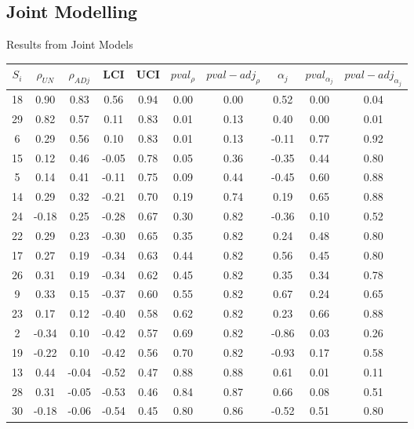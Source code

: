 \documentclass[a4paper,9pt]{beamer}\usepackage[]{graphicx}\usepackage[]{color}
\begin{document}
\subsection{Joint Modelling}

\begin{frame}{Results from Joint Models}
\tiny
\begin{table}[ht]
\centering
\begin{tabular}{cccccccccc}
  \hline
$S_i$ & $\rho_{UN}$ & $\rho_{ADj}$ & LCI & UCI & $pval_{\rho}$ & $pval-adj_{\rho}$ & $\alpha_j$ & $pval_{\alpha_j}$ & $pval-adj_{\alpha_j}$ \\ 
  \hline
\alert{18} & 0.90 & 0.83 & 0.56 & 0.94 & 0.00 & 0.00 & 0.52 & 0.00 & 0.04 \\ 
 \alert{29} & 0.82 & 0.57 & 0.11 & 0.83 & 0.01 & 0.13 & 0.40 & 0.00 & 0.01\\ 
  \alert{6} & 0.29 & 0.56 & 0.10 & 0.83 & 0.01 & 0.13 & -0.11 & 0.77 & 0.92 \\ 
  \alert{15} & 0.12 & 0.46 & -0.05 & 0.78 & 0.05 & 0.36 & -0.35 & 0.44 & 0.80 \\ 
  \alert{5} & 0.14 & 0.41 & -0.11 & 0.75 & 0.09 & 0.44 & -0.45 & 0.60 & 0.88 \\ 
  \alert{14} & 0.29 & 0.32 & -0.21 & 0.70 & 0.19 & 0.74 & 0.19 & 0.65 & 0.88 \\ 
  \alert{24} & -0.18 & 0.25 & -0.28 & 0.67 & 0.30 & 0.82 & -0.36 & 0.10 & 0.52 \\ 
  \alert{22} & 0.29 & 0.23 & -0.30 & 0.65 & 0.35 & 0.82 & 0.24 & 0.48 & 0.80 \\ 
  \alert{17} & 0.27 & 0.19 & -0.34 & 0.63 & 0.44 & 0.82 & 0.56 & 0.45 & 0.80 \\ 
  \alert{26} & 0.31 & 0.19 & -0.34 & 0.62 & 0.45 & 0.82 & 0.35 & 0.34 & 0.78 \\ 
  9 & 0.33 & 0.15 & -0.37 & 0.60 & 0.55 & 0.82 & 0.67 & 0.24 & 0.65 \\ 
  23 & 0.17 & 0.12 & -0.40 & 0.58 & 0.62 & 0.82 & 0.23 & 0.66 & 0.88 \\ 
  2 & -0.34 & 0.10 & -0.42 & 0.57 & 0.69 & 0.82 & -0.86 & 0.03 & 0.26 \\ 
  19 & -0.22 & 0.10 & -0.42 & 0.56 & 0.70 & 0.82 & -0.93 & 0.17 & 0.58 \\ 
  13 & 0.44 & -0.04 & -0.52 & 0.47 & 0.88 & 0.88 & 0.61 & 0.01 & 0.11 \\ 
  28 & 0.31 & -0.05 & -0.53 & 0.46 & 0.84 & 0.87 & 0.66 & 0.08 & 0.51 \\ 
  30 & -0.18 & -0.06 & -0.54 & 0.45 & 0.80 & 0.86 & -0.52 & 0.51 & 0.80 \\ 

\end{tabular}
\end{table}
\end{frame}
\end{document}
